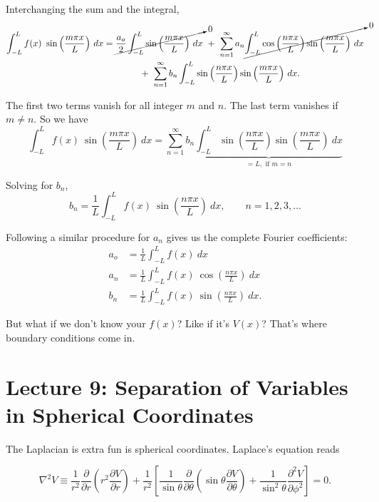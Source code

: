 \documentclass{article}
\numberwithin{equation}{section}
\begin{document}
Interchanging the sum and the integral,
\begin{align*}
    \int_{-L}^{L} f(x)\ \sin{\left( \frac{m\pi x}{L} \right)}\ dx &= \cancelto{0}{\frac{a_o}{2} \int_{-L}^{L} \sin{\left( \frac{m\pi x}{L} \right)}\ dx}\ +\ \sum_{n = 1}^{\infty} a_n \cancelto{0}{\int_{-L}^{L} \cos{\left( \frac{n\pi x}{L} \right)} \sin{\left( \frac{m\pi x}{L} \right)}\ dx} \\
    &\qquad\qquad +\ \sum_{n = 1}^{\infty} b_n \int_{-L}^{L} \sin{\left( \frac{n\pi x}{L} \right)} \sin{\left( \frac{m\pi x}{L} \right)}\ dx.
\end{align*}

The first two terms vanish for all integer $m$ and $n$. The last term vanishes if $m \neq n$. So we have
\begin{equation*}
    \int_{-L}^{L} f(x)\ \sin{\left( \frac{m\pi x}{L} \right)}\ dx = \sum_{n = 1}^{\infty} b_n \underbrace{\int_{-L}^{L} \sin{\left( \frac{n\pi x}{L} \right)} \sin{\left( \frac{m\pi x}{L} \right)}\ dx}_{\displaystyle = L, \text{ if } m = n}
\end{equation*}

Solving for $b_n$,
\begin{equation*}
    b_n = \frac{1}{L} \int_{-L}^{L} f(x)\ \sin{\left( \frac{n\pi x}{L} \right)}\ dx, \qquad n = 1, 2, 3, \dots
\end{equation*}

Following a similar procedure for $a_n$ gives us the complete Fourier coefficients:
\begin{align*}
    a_o &= \frac{1}{L} \int_{-L}^{L} f(x)\ dx \\
    a_n &= \frac{1}{L} \int_{-L}^{L} f(x)\ \cos{\left( \frac{n\pi x}{L} \right)}\ dx \\
    b_n &= \frac{1}{L} \int_{-L}^{L} f(x)\ \sin{\left( \frac{n\pi x}{L} \right)}\ dx.
\end{align*}

But what if we don't know your $f(x)$? Like if it's $V(x)$? That's where boundary conditions come in.


\newpage

\section*{Lecture 9: Separation of Variables in Spherical Coordinates}
\setcounter{page}{1}

The Laplacian is extra fun is spherical coordinates. Laplace's equation reads

\begin{equation*}
    \nabla^2 V \equiv \frac{1}{r^2} \frac{\partial}{\partial r} \left( r^2 \frac{\partial V}{\partial r} \right) + \frac{1}{r^2} \left[ \frac{1}{\sin{\theta}} \frac{\partial}{\partial \theta} \left( \sin{\theta} \frac{\partial V}{\partial \theta} \right) + \frac{1}{\sin^2{\theta}} \frac{\partial^2 V}{\partial \phi^2} \right] = 0.
\end{equation*}
\end{document}
